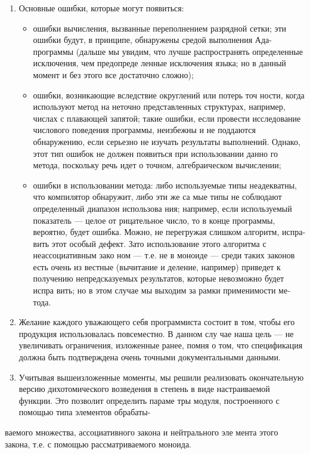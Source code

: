 \begin{enumerate}
\item Основные ошибки, которые могут появиться:
\begin{itemize}
\item ошибки вычисления, вызванные переполнением разрядной
сетки; эти ошибки будут, в принципе, обнаружены средой
выполнения Ада-программы (дальше мы увидим, что лучше
распространять определенные исключения, чем предопреде­
ленные исключения языка; но в данный момент и без этого
все достаточно сложно);
\item ошибки, возникающие вследствие округлений или потерь точ­
ности, когда используют метод на неточно представленных
структурах, например, числах с плавающей запятой; такие
ошибки, если провести исследование числового поведения
программы, неизбежны и не поддаются обнаружению, если
серьезно не изучать результаты выполнений. Однако, этот
тип ошибок не должен появиться при использовании данно­
го метода, поскольку речь идет о точном, алгебраическом
вычислении;
\item ошибки в использовании метода: либо используемые типы
неадекватны, что компилятор обнаружит, либо эти же са­
мые типы не соблюдают определенный диапазон использова­
ния; например, если используемый показатель — целое от­
рицательное число, то в конце программы, вероятно, будет
ошибка. Можно, не перегружая слишком алгоритм, испра­
вить этот особый дефект.
Зато использование этого алгоритма с неассоциативным зако­
ном — т.е. не в моноиде — среди таких законов есть очень из­
вестные (вычитание и деление, например) приведет к получению
непредсказуемых результатов, которые невозможно будет испра­
вить; но в этом случае мы выходим за рамки применимости ме­
тода.
\end{itemize}
\item Желание каждого уважающего себя программиста состоит в том,
чтобы его продукция использовалась повсеместно. В данном слу­
чае наша цель — не увеличивать ограничения, изложенные ранее,
помня о том, что спецификация должна быть подтверждена очень
точными документальными данными.
\item Учитывая вышеизложенные моменты, мы решили реализовать
окончательную версию дихотомического возведения в степень в
виде настраиваемой функции. Это позволит определить параме­
тры модуля, построенного с помощью типа элементов обрабаты-
\end{enumerate}
\newpage

\begin{center}
\parbox{12cm}{
ваемого множества, ассоциативного закона и нейтрального эле­
мента этого закона, т.е. с помощью рассматриваемого моноида.
}
\end{center}


